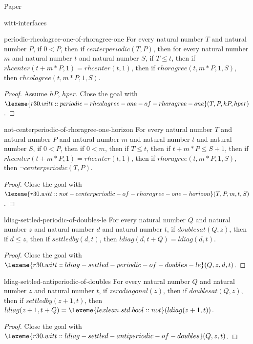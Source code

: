 \begin{lexlean}{Paper}
\begin{section}{witt-interfaces}
  \begin{theorem}{periodic-rhcolagree-one-of-rhoragree-one}
  For every natural number \(T\) and natural number \(P\), if \(0 < P\), then if \(centerperiodic(T, P)\), then for every natural number \(m\) and natural number \(t\) and natural number \(S\), if \(T ≤ t\), then if \(rhcenter(t + m * P, 1) = rhcenter(t, 1)\), then if \(rhoragree(t, m * P, 1, S)\), then \(rhcolagree(t, m * P, 1, S)\).
  \begin{proof}
  Assume \(hP\), \(hper\).
  Close the goal with \(\lexeme{r30.witt::periodic-rhcolagree-one-of-rhoragree-one}(T, P, hP, hper)\).
  \end{proof}
  \end{theorem}

  \begin{theorem}{not-centerperiodic-of-rhoragree-one-horizon}
  For every natural number \(T\) and natural number \(P\) and natural number \(m\) and natural number \(t\) and natural number \(S\), if \(0 < P\), then if \(0 < m\), then if \(T ≤ t\), then if \(t + m * P ≤ S + 1\), then if \(rhcenter(t + m * P, 1) = rhcenter(t, 1)\), then if \(rhoragree(t, m * P, 1, S)\), then \(¬ centerperiodic(T, P)\).
  \begin{proof}
  Close the goal with \(\lexeme{r30.witt::not-centerperiodic-of-rhoragree-one-horizon}(T, P, m, t, S)\).
  \end{proof}
  \end{theorem}

  \begin{theorem}{ldiag-settled-periodic-of-doubles-le}
  For every natural number \(Q\) and natural number \(z\) and natural number \(d\) and natural number \(t\), if \(doublesat(Q, z)\), then if \(d ≤ z\), then if \(settledby(d, t)\), then \(ldiag(d, t + Q) = ldiag(d, t)\).
  \begin{proof}
  Close the goal with \(\lexeme{r30.witt::ldiag-settled-periodic-of-doubles-le}(Q, z, d, t)\).
  \end{proof}
  \end{theorem}

  \begin{theorem}{ldiag-settled-antiperiodic-of-doubles}
  For every natural number \(Q\) and natural number \(z\) and natural number \(t\), if \(zerodiagonal(z)\), then if \(doublesat(Q, z)\), then if \(settledby(z + 1, t)\), then \(ldiag(z + 1, t + Q) = \lexeme{lexlean.std.bool::not}(ldiag(z + 1, t))\).
  \begin{proof}
  Close the goal with \(\lexeme{r30.witt::ldiag-settled-antiperiodic-of-doubles}(Q, z, t)\).
  \end{proof}
  \end{theorem}


\end{section}
\end{lexlean}
